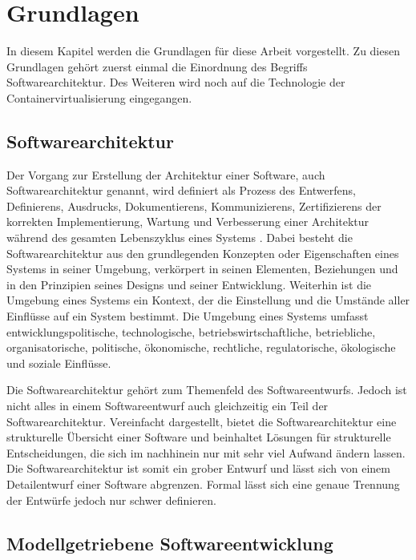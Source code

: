 \chapter{Grundlagen}
\label{sec:FUNDAMENTALS}

In diesem Kapitel werden die Grundlagen für diese Arbeit vorgestellt. Zu diesen Grundlagen gehört zuerst einmal die Einordnung des Begriffs Softwarearchitektur. Des Weiteren wird noch auf die Technologie der Containervirtualisierung eingegangen.

\section{Softwarearchitektur}
\label{sec:FUNDAMENTALS_ARCHITECTURE}

Der Vorgang zur Erstellung der Architektur einer Software, auch Softwarearchitektur genannt, wird definiert als Prozess des Entwerfens, Definierens, Ausdrucks, Dokumentierens, Kommunizierens, Zertifizierens der korrekten Implementierung, Wartung und Verbesserung einer Architektur während des gesamten Lebenszyklus eines Systems \cite{ISO_IEC_42010}. Dabei besteht die Softwarearchitektur aus den grundlegenden Konzepten oder Eigenschaften eines Systems in seiner Umgebung, verkörpert in seinen Elementen, Beziehungen und in den Prinzipien seines Designs und seiner Entwicklung. Weiterhin ist die Umgebung eines Systems ein Kontext, der die Einstellung und die Umstände aller Einflüsse auf ein System bestimmt. Die Umgebung eines Systems umfasst entwicklungspolitische, technologische, betriebswirtschaftliche, betriebliche, organisatorische, politische, ökonomische, rechtliche, regulatorische, ökologische und soziale Einflüsse.

Die Softwarearchitektur gehört zum Themenfeld des Softwareentwurfs. Jedoch ist nicht alles in einem Softwareentwurf auch gleichzeitig ein Teil der Softwarearchitektur. Vereinfacht dargestellt, bietet die Softwarearchitektur eine strukturelle Übersicht einer Software und beinhaltet Lösungen für strukturelle Entscheidungen, die sich im nachhinein nur mit sehr viel Aufwand ändern lassen. Die Softwarearchitektur ist somit ein grober Entwurf und lässt sich von einem Detailentwurf einer Software abgrenzen. Formal lässt sich eine genaue Trennung der Entwürfe jedoch nur schwer definieren.

\section{Modellgetriebene Softwareentwicklung}
\label{sec:FUNDAMENTALS_MDSD}

